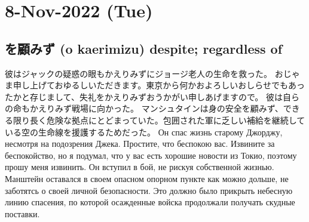 \section{8-Nov-2022 (Tue)}
\subsection{を顧みず (o kaerimizu)  despite; regardless of}

彼はジャックの疑惑の眼もかえりみずにジョージ老人の生命を救った。
おじゃま申し上げておゆるしいただきます。東京から何かおよろしいおしらせでもあったかと存じまして、失礼をかえりみずおうかがい申しあげますので。
彼は自らの命もかえりみず戦場に向かった。
マンシュタインは身の安全を顧みず、できる限り長く危険な拠点にとどまっていた。包囲された軍に乏しい補給を継続している空の生命線を援護するためだった。
Он спас жизнь старому Джорджу, несмотря на подозрения Джека.
Простите, что беспокою вас. Извините за беспокойство, но я подумал, что у вас есть хорошие новости из Токио, поэтому прошу меня извинить.
Он вступил в бой, не рискуя собственной жизнью.
Манштейн оставался в своем опасном опорном пункте как можно дольше, не заботятсь о своей личной безопасности. Это должно было прикрыть небесную линию спасения, по которой осажденные войска продолжали получать скудные поставки.